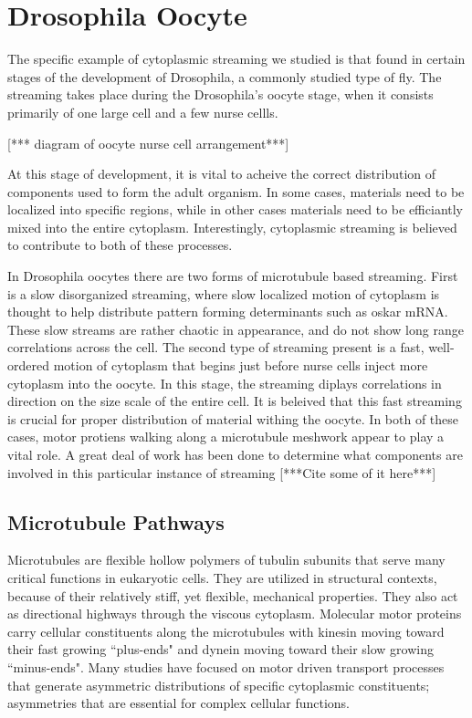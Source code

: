\documentclass[11pt]{ucthesis}
\begin{document}
\section{Drosophila Oocyte}
The specific example of cytoplasmic streaming we studied is that found in certain stages of the development of Drosophila, a commonly studied type of fly. 
The streaming takes place during the Drosophila's oocyte stage, when it consists primarily of one large cell and a few nurse cellls.

[*** diagram of oocyte nurse cell arrangement***]

At this stage of development, it is vital to acheive the correct distribution of components used to form the adult organism. 
In some cases, materials need to be localized into specific regions, while in other cases materials need to be efficiantly mixed into the entire cytoplasm.
Interestingly, cytoplasmic streaming is believed to contribute to both of these processes.

In Drosophila oocytes there are two forms of microtubule based streaming. 
First is a slow disorganized streaming, where slow localized motion of cytoplasm is thought to help distribute pattern forming determinants such as oskar mRNA. 
These slow streams are rather chaotic in appearance, and do not show long range correlations across the cell.
The second type of streaming present is a fast, well-ordered motion of cytoplasm that begins just before nurse cells inject more cytoplasm into the oocyte. 
In this stage, the streaming diplays correlations in direction on the size scale of the entire cell. It is beleived that this fast streaming is crucial for proper distribution of material withing the oocyte.
In both of these cases, motor protiens walking along a microtubule meshwork appear to play a vital role. 
A great deal of work has been done to determine what components are involved in this particular instance of streaming [***Cite some of it here***]

\subsection{Microtubule Pathways}
Microtubules are flexible hollow polymers of tubulin subunits that
serve many critical functions in eukaryotic cells. They are utilized
in structural contexts, because of their relatively stiff, yet flexible,
mechanical properties.  They also act as directional highways through the
viscous cytoplasm. Molecular motor proteins carry cellular constituents
along the microtubules with kinesin moving toward their fast growing
``plus-ends" and dynein moving toward their slow growing ``minus-ends".
Many studies have focused on motor driven transport processes that
generate asymmetric distributions of specific cytoplasmic constituents;
asymmetries that are essential for complex cellular functions. 
\end{document}
